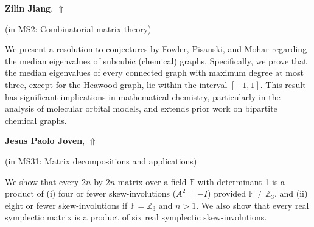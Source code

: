 \documentclass[ILAS2025-program.tex]{subfiles}
\begin{document}
\hypertarget{down0033}{}\begin{ilasabstract}
    
\textbf{Zilin Jiang},  \hfill \hyperlink{up0033}{$\Uparrow$}
    
    
(in {\color{mstitle}MS2: Combinatorial matrix theory})
        
\mtskip
    We present a resolution to conjectures by Fowler, Pisanski, and Mohar regarding the median eigenvalues of subcubic (chemical) graphs. Specifically, we prove that the median eigenvalues of every connected graph with maximum degree at most three, except for the Heawood graph, lie within the interval $[-1, 1]$. This result has significant implications in mathematical chemistry, particularly in the analysis of molecular orbital models, and extends prior work on bipartite chemical graphs.

\end{ilasabstract}
    

\hypertarget{down0308}{}\begin{ilasabstract}
    
\textbf{Jesus Paolo Joven},  \hfill \hyperlink{up0308}{$\Uparrow$}
    
    
(in {\color{mstitle}MS31: Matrix decompositions and applications})
        
\mtskip
    We show that every $2n$-by-$2n$ matrix over a field $\mathbb{F}$ with determinant 1 is a product of (i) four or fewer skew-involutions ($A^2 = -I$) provided $\mathbb{F} \neq \mathbb{Z}_3$, and (ii) eight or fewer skew-involutions if $\mathbb{F} = \mathbb{Z}_3$ and $n > 1$. We also show that every real symplectic matrix is a product of six real symplectic skew-involutions. 

\end{ilasabstract}
    
\end{document}
